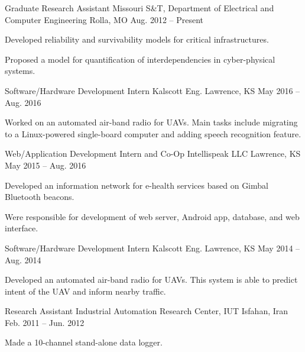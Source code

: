 \begin{cventries}
  \cventry
    {Graduate Research Assistant}
    {Missouri S\&T, Department of Electrical and Computer Engineering}
    {Rolla, MO}
    {Aug. 2012 -- Present}
    {
      \begin{cvitems}
        \item Developed reliability and survivability models for critical infrastructures.
        \item Proposed a model for quantification of interdependencies in cyber-physical systems.
      \end{cvitems}
    }
  \cventry
    {Software/Hardware Development Intern}
    {Kalscott Eng.}
    {Lawrence, KS}
    {May 2016 -- Aug. 2016}
    {
      \begin{cvitems}
        \item Worked on an automated air-band radio for UAVs. Main tasks include migrating to a Linux-powered single-board computer and adding speech recognition feature.
      \end{cvitems}
    }
  \cventry
    {Web/Application Development Intern and Co-Op}
    {Intellispeak LLC}
    {Lawrence, KS}
    {May 2015 -- Aug. 2016}
    {
      \begin{cvitems}
        \item Developed an information network for e-health services based on Gimbal Bluetooth beacons.
        \item Were responsible for development of web server, Android app, database, and web interface.
      \end{cvitems}
    }
  \cventry
    {Software/Hardware Development Intern}
    {Kalscott Eng.}
    {Lawrence, KS}
    {May 2014 -- Aug. 2014}
    {
      \begin{cvitems}
        \item Developed an automated air-band radio for UAVs. This system is able to predict intent of the UAV and inform nearby traffic.
      \end{cvitems}
    }
  \cventry
    {Research Assistant}
    {Industrial Automation Research Center, IUT}
    {Isfahan, Iran}
    {Feb. 2011 -- Jun. 2012}
    {
      \begin{cvitems}
        \item Made a 10-channel stand-alone data logger.

\end{cvitems}}
\end{cventries}
